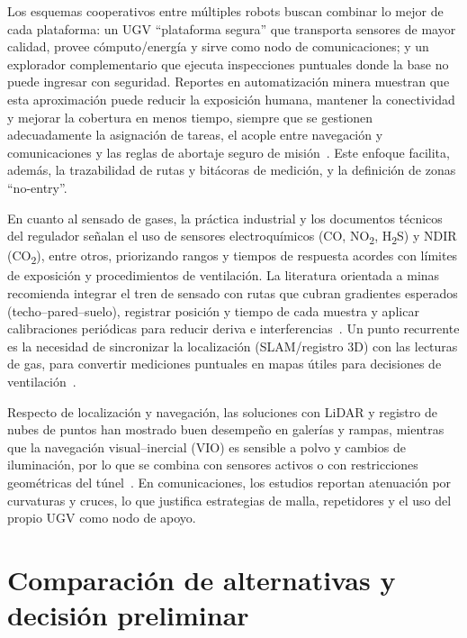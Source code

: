 Los esquemas cooperativos entre múltiples robots buscan combinar lo mejor de cada plataforma: un UGV ``plataforma segura'' que transporta sensores de mayor calidad, provee cómputo/energía y sirve como nodo de comunicaciones; y un explorador complementario que ejecuta inspecciones puntuales donde la base no puede ingresar con seguridad. Reportes en automatización minera muestran que esta aproximación puede reducir la exposición humana, mantener la conectividad y mejorar la cobertura en menos tiempo, siempre que se gestionen adecuadamente la asignación de tareas, el acople entre navegación y comunicaciones y las reglas de abortaje seguro de misión~\cite{AdvancesMining_2023}. Este enfoque facilita, además, la trazabilidad de rutas y bitácoras de medición, y la definición de zonas ``no-entry''.

En cuanto al sensado de gases, la práctica industrial y los documentos técnicos del regulador señalan el uso de sensores electroquímicos (CO, NO\textsubscript{2}, H\textsubscript{2}S) y NDIR (CO\textsubscript{2}), entre otros, priorizando rangos y tiempos de respuesta acordes con límites de exposición y procedimientos de ventilación. La literatura orientada a minas recomienda integrar el tren de sensado con rutas que cubran gradientes esperados (techo--pared--suelo), registrar posición y tiempo de cada muestra y aplicar calibraciones periódicas para reducir deriva e interferencias~\cite{OSINERGMIN_BoletinGSM_2020b,MINEM_DS024_2016,EU_ExposureDirective_2020}. Un punto recurrente es la necesidad de sincronizar la localización (SLAM/registro 3D) con las lecturas de gas, para convertir mediciones puntuales en mapas útiles para decisiones de ventilación~\cite{KimChoi_2025_MineMapping}.

Respecto de localización y navegación, las soluciones con LiDAR y registro de nubes de puntos han mostrado buen desempeño en galerías y rampas, mientras que la navegación visual--inercial (VIO) es sensible a polvo y cambios de iluminación, por lo que se combina con sensores activos o con restricciones geométricas del túnel~\cite{KimChoi_2025_MineMapping}. En comunicaciones, los estudios reportan atenuación por curvaturas y cruces, lo que justifica estrategias de malla, repetidores y el uso del propio UGV como nodo de apoyo.



\section{Comparación de alternativas y decisión preliminar}

